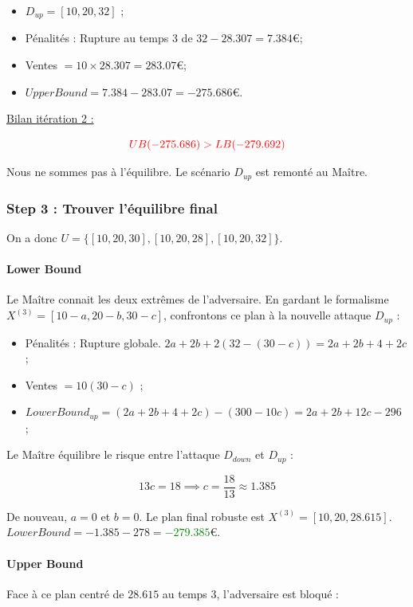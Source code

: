 \documentclass[11pt,a4paper]{article}
\begin{document}
    \begin{itemize}
        \item $D_{up}=[10, 20, 32]$ ;
        \item Pénalités : Rupture au temps $3$ de $32-28.307=7.384$\euro ;
        \item Ventes $=10\times28.307=283.07$\euro ;
        \item $UpperBound=7.384-283.07=-275.686$\euro.
    \end{itemize}
    
    \underline{Bilan itération 2 :}
    
    \[
        \textcolor{red}{UB(-275.686) > LB(-279.692)}
    \]
    
    Nous ne sommes pas à l'équilibre. Le scénario $D_{up}$ est remonté au Maître.
    
    \subsubsection{Step 3 : Trouver l'équilibre final}
    
    On a donc $U=\{[10, 20, 30], [10, 20, 28], [10, 20, 32]\}$.
    
    \paragraph{Lower Bound} Le Maître connait les deux extrêmes de l'adversaire. En gardant le formalisme $X^{(3)}=[10-a, 20-b, 30-c]$, confrontons ce plan à la nouvelle attaque $D_{up}$ :
    
    \begin{itemize}
        \item Pénalités : Rupture globale. $2a+2b+2(32-(30-c))=2a+2b+4+2c$ ;
        \item Ventes $=10(30-c)$ ;
        \item $LowerBound_{up}=(2a+2b+4+2c)-(300-10c)=2a+2b+12c-296$ ;
    \end{itemize}
    
    Le Maître équilibre le risque entre l'attaque $D_{down}$ et $D_{up}$ :
    
    \[
        13c = 18 \implies c = \frac{18}{13} \approx 1.385
    \]
    
    De nouveau, $a=0$ et $b=0$. Le plan final robuste est $X^{(3)}=[10, 20, 28.615]$. $LowerBound = -1.385-278=$\textcolor{green}{$-279.385$}\euro.
    
    \paragraph{Upper Bound} Face à ce plan centré de $28.615$ au temps $3$, l'adversaire est bloqué :
    
\end{document}
